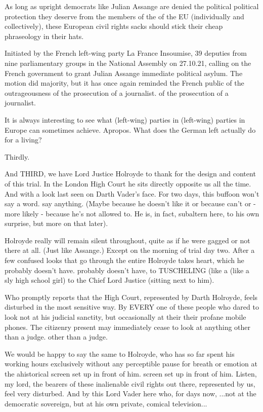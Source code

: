 \begin{multicols}{2}
As long as upright democrats like Julian Assange are denied the political
political protection they deserve from the members of the
of the EU (individually and collectively), these European civil rights sacks should stick their cheap phraseology in their hats.

Initiated by the French left-wing party La France Insoumise, 39 deputies from nine parliamentary groups in the
National Assembly on 27.10.21, calling on the French government to grant Julian Assange immediate political asylum. The motion did
majority, but it has once again reminded the French public of the outrageousness of the prosecution of a journalist.
of the prosecution of a journalist.

It is always interesting to see what (left-wing) parties in
(left-wing) parties in Europe can sometimes achieve. Apropos. What
does the German left actually do for a living?

Thirdly.

And THIRD, we have Lord Justice Holroyde to thank for the design and content of this trial. In the London High
Court he sits directly opposite us all the time. And
with a look last seen on Darth Vader's face. For two days, this buffoon won't say a word.
say anything. (Maybe because he doesn't like it or because
can't or - more likely - because he's not allowed to.
He is, in fact, subaltern here, to his own surprise, but more on that later).

Holroyde really will remain silent throughout, quite
as if he were gagged or not there at all. (Just like Assange.) Except on the morning of trial day two.
After a few confused looks that go through the entire
Holroyde takes heart, which he probably doesn't have.
probably doesn't have, to TUSCHELING (like a
(like a sly high school girl) to the Chief Lord Justice (sitting next to him).

Who promptly reports that the High Court, represented by Darth Holroyde, feels disturbed in the most sensitive way. By EVERY one of these people
who dared to look not at his judicial sanctity, but occasionally at their
their profane mobile phones. The citizenry present
may immediately cease to look at anything other than a judge.
other than a judge.

We would be happy to say the same to Holroyde, who has so far spent his working hours exclusively
without any perceptible pause for breath or emotion at the ahistorical screen set up in front of him.
screen set up in front of him. Listen, my lord, the bearers
of these inalienable civil rights out there, represented by us, feel very disturbed. And
by this Lord Vader here who, for days now,
...not at the democratic sovereign, but at his own private, comical television...


\end{multicols}
